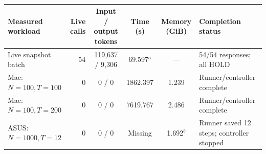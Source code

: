 \begin{table}[t]
\centering\small
\caption{}
\label{tab:rq3_results}
\begin{tabularx}{\textwidth}{@{}l r c c c X@{}}
\toprule
Measured workload & Live calls & Input / output tokens & Time (s) & Memory (GiB) & Completion status \\
\midrule
Live snapshot batch & 54 & 119,637 / 9,306 & 69.597$^{a}$ & --- & 54/54 responses; all HOLD \\
Mac: $N=100,T=100$ & 0 & 0 / 0 & 1862.397 & 1.239 & Runner/controller complete \\
Mac: $N=100,T=200$ & 0 & 0 / 0 & 7619.767 & 2.486 & Runner/controller complete \\
ASUS: $N=1000,T=12$ & 0 & 0 / 0 & Missing & 1.692$^{b}$ & Runner saved 12 steps; controller stopped \\
\bottomrule
\end{tabularx}
\end{table}
